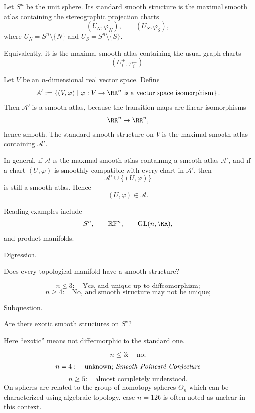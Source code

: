 \begin{example}
Let $S^n$ be the unit sphere. Its standard smooth structure is the maximal smooth atlas containing the stereographic projection charts
\[
  (U_N,\varphi_N),
  \qquad
  (U_S,\varphi_S),
\]
where $U_N=S^n\setminus\{N\}$ and $U_S=S^n\setminus\{S\}$.

Equivalently, it is the maximal smooth atlas containing the usual graph charts
\[
  (U_i^\pm,\varphi_i^\pm).
\]
\end{example}

\begin{example}
Let $V$ be an $n$-dimensional real vector space. Define
\[
  \mathcal A'
  :=
  \left\{
    (V,\varphi)
    \mid
    \varphi:V\to \RR^n \text{ is a vector space isomorphism}
  \right\}.
\]
Then $\mathcal A'$ is a smooth atlas, because the transition maps are linear isomorphisms
\[
  \RR^n\to \RR^n,
\]
hence smooth. The standard smooth structure on $V$ is the maximal smooth atlas containing $\mathcal A'$.
\end{example}

\begin{remark}
In general, if $\mathcal A$ is the maximal smooth atlas containing a smooth atlas $\mathcal A'$, and if a chart $(U,\varphi)$ is smoothly compatible with every chart in $\mathcal A'$, then
\[
  \mathcal A'\cup\{(U,\varphi)\}
\]
is still a smooth atlas. Hence
\[
  (U,\varphi)\in\mathcal A.
\]
\end{remark}

\begin{remark}
Reading examples include
\[
  S^n,\qquad \mathbb{RP}^n,\qquad \operatorname{GL}(n,\RR),
\]
and product manifolds.
\end{remark}

\begin{remark}
Digression.

Does every topological manifold have a smooth structure?

\[
  n\le 3:\quad \text{Yes, and unique up to diffeomorphism;}
\]
\[
  n\ge 4:\quad \text{No, and smooth structure may not be unique;}
\]

\end{remark}

\begin{remark}
Subquestion.

Are there exotic smooth structures on $S^n$?

Here ``exotic'' means not diffeomorphic to the standard one.

\[
  n\le 3:\quad \text{no;}
\]
\[
  n=4:\quad \text{unknown; \textit{Smooth Poincaré Conjecture}}
\]
\[
  n\ge 5:\quad \text{almost completely understood.} 
\]
On spheres are related to the group of homotopy spheres $\Theta_n$ which can be characterized using algebraic topology. case $n=126$ is often noted as unclear in this context.
\end{remark}


